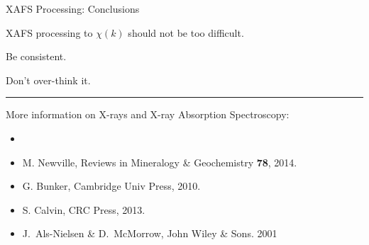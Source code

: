 

\begin{slide}{XAFS Processing: Conclusions}


  \begin{cenpage}{120mm}

    XAFS processing to $\chi(k)$ should not be too difficult.

    \vmm

    Be consistent.

    \vmm


    Don't over-think it.


  \vmm\vmm \hrule \vmm
  
  More information on X-rays and X-ray Absorption Spectroscopy:

  \begin{itemize}
  \item[] {}
  \item[] {} M. Newville, Reviews in  Mineralogy \& Geochemistry {\bf{78}}, 2014.
  \item[] {} G. Bunker, Cambridge Univ  Press,  2010.
  \item[] {} S. Calvin, CRC Press, 2013.
  \item[]  {}  J.~Als-Nielsen
    \& D.~McMorrow,  John Wiley \& Sons. 2001
    
  \end{itemize}

\end{cenpage}


 \vfill
\end{slide}
 
